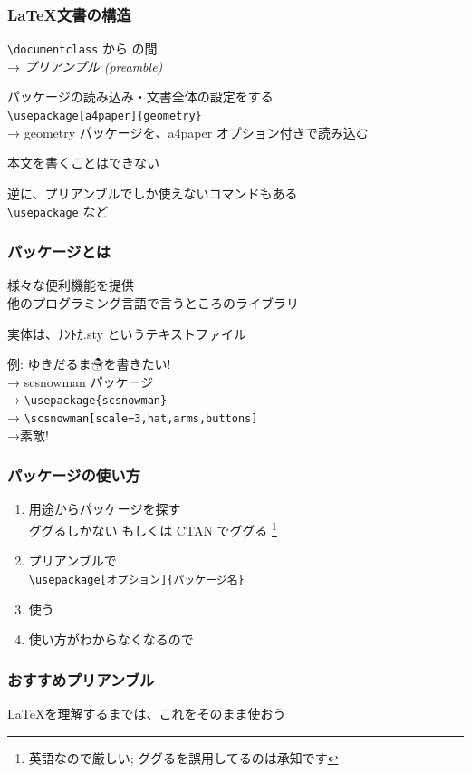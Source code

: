 \begin{frame}[fragile]
	\frametitle{\LaTeX 文書の構造}
	\verb+\documentclass+ から \verb++ の間\\
	→ \emph{プリアンブル (preamble)}

	パッケージの読み込み・文書全体の設定をする\\
	{\footnotesize\verb+\usepackage[a4paper]{geometry}+\\
	→ geometry パッケージを、a4paper オプション付きで読み込む}

	本文を書くことはできない

	逆に、プリアンブルでしか使えないコマンドもある\\
	{\footnotesize \verb+\usepackage+ など}
\end{frame}

\begin{frame}[fragile]
	\frametitle{パッケージとは}
	様々な便利機能を提供\\
	{\footnotesize 他のプログラミング言語で言うところのライブラリ}

	実体は、ﾅﾝﾄｶ.sty というテキストファイル

	例: ゆきだるま☃を書きたい!\\
	→ scsnowman パッケージ\\
	→ \verb+\usepackage{scsnowman}+ \\
	→ \verb+\scsnowman[scale=3,hat,arms,buttons]+ \\
	→\scsnowman[scale=3,hat,arms,buttons] 素敵!
\end{frame}

\begin{frame}[fragile]
	\frametitle{パッケージの使い方}
	\begin{enumerate}
		\item 用途からパッケージを探す\\
			{\footnotesize ググるしかない もしくは CTAN でググる
			\footnote{英語なので厳しい; {\tiny ググるを誤用してるのは承知です}}}
		\item プリアンブルで\\\verb+\usepackage[オプション]{パッケージ名}+
		\item 使う
		\item 使い方がわからなくなるので 
	\end{enumerate}
\end{frame}

\begin{frame}[fragile]
	\frametitle{おすすめプリアンブル}
	

	\LaTeX を理解するまでは、これをそのまま使おう
\end{frame}

